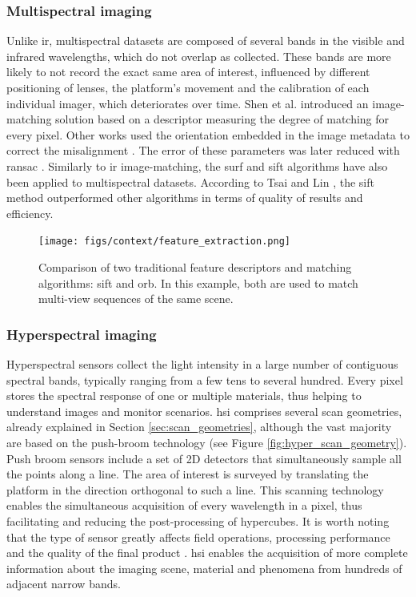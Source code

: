 \subsubsection{Multispectral imaging}

Unlike \acrshort{ir}, multispectral datasets are composed of several bands in the visible and infrared wavelengths, which do not overlap as collected. These bands are more likely to not record the exact same area of interest, influenced by different positioning of lenses, the platform's movement and the calibration of each individual imager, which deteriorates over time. Shen et al. \cite{shen_multi-modal_2014} introduced an image-matching solution based on a descriptor measuring the degree of matching for every pixel. Other works used the orientation embedded in the image metadata to correct the misalignment \cite{jhan_band--band_2016}. The error of these parameters was later reduced with \acrshort{ransac} \cite{jhan_investigation_2017}. Similarly to \acrshort{ir} image-matching, the \acrshort{surf} \cite{sedaghat_high-resolution_2019} and \acrshort{sift} \cite{saleem_robust_2014} algorithms have also been applied to multispectral datasets. According to Tsai and Lin \cite{tsai_accelerated_2017}, the \acrshort{sift} method outperformed other algorithms in terms of quality of results and efficiency.

\begin{figure}[ht]
	\texttt{[image: figs/context/feature\_extraction.png]}
	\caption{Comparison of two traditional feature descriptors and matching algorithms: \acrshort{sift} and  \acrshort{orb}. In this example, both are used to match multi-view sequences of the same scene.}
    \label{fig:feature_descriptors}
\end{figure}

\subsubsection{Hyperspectral imaging}

Hyperspectral sensors collect the light intensity in a large number of contiguous spectral bands, typically ranging from a few tens to several hundred. Every pixel stores the spectral response of one or multiple materials, thus helping to understand images and monitor scenarios. \acrshort{hsi} comprises several scan geometries, already explained in Section \ref{sec:scan_geometries}, although the vast majority are based on the push-broom technology (see Figure \ref{fig:hyper_scan_geometry}). Push broom sensors include a set of 2D detectors that simultaneously sample all the points along a line. The area of interest is surveyed by translating the platform in the direction orthogonal to such a line. This scanning technology enables the simultaneous acquisition of every wavelength in a pixel, thus facilitating and reducing the post-processing of hypercubes. It is worth noting that the type of sensor greatly affects field operations, processing performance and the quality of the final product \cite{adao_hyperspectral_2017}. \acrshort{hsi} enables the acquisition of more complete information about the imaging scene, material and phenomena from hundreds of adjacent narrow bands.

